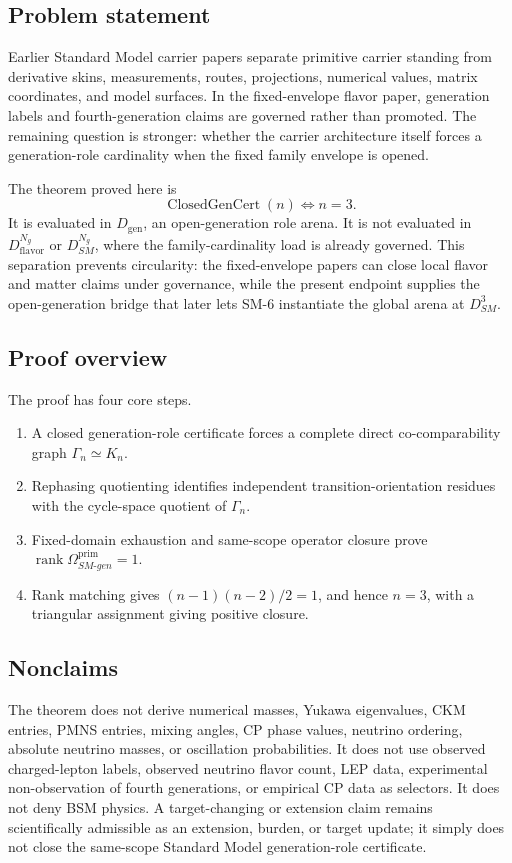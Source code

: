 \documentclass[11pt]{article}
\newcommand{\Dgen}{D_{\mathrm{gen}}}
\newcommand{\DflavNg}{D_{\mathrm{flavor}}^{N_g}}
\newcommand{\DSMN}{D_{SM}^{N_g}}
\newcommand{\DSMthree}{D_{SM}^{3}}
\newcommand{\ClosedGenCert}{\operatorname{ClosedGenCert}}
\newcommand{\rank}{\operatorname{rank}}
\theoremstyle{definition}
\theoremstyle{plain}
\theoremstyle{remark}
\begin{document}
\subsection{Problem statement}
Earlier Standard Model carrier papers separate primitive carrier standing from derivative skins, measurements, routes, projections, numerical values, matrix coordinates, and model surfaces. In the fixed-envelope flavor paper, generation labels and fourth-generation claims are governed rather than promoted. The remaining question is stronger: whether the carrier architecture itself forces a generation-role cardinality when the fixed family envelope is opened.

The theorem proved here is
\[
\ClosedGenCert(n) \Longleftrightarrow n=3.
\]
It is evaluated in \(\Dgen\), an open-generation role arena. It is not evaluated in \(\DflavNg\) or \(\DSMN\), where the family-cardinality load is already governed. This separation prevents circularity: the fixed-envelope papers can close local flavor and matter claims under governance, while the present endpoint supplies the open-generation bridge that later lets SM-6 instantiate the global arena at \(\DSMthree\).

\subsection{Proof overview}
The proof has four core steps.
\begin{enumerate}
\item A closed generation-role certificate forces a complete direct co-comparability graph \(\Gamma_n\simeq K_n\).
\item Rephasing quotienting identifies independent transition-orientation residues with the cycle-space quotient of \(\Gamma_n\).
\item Fixed-domain exhaustion and same-scope operator closure prove \(\rank \Omega_{SM\text{-}gen}^{\mathrm{prim}}=1\).
\item Rank matching gives \((n-1)(n-2)/2=1\), and hence \(n=3\), with a triangular assignment giving positive closure.
\end{enumerate}

\subsection{Nonclaims}
The theorem does not derive numerical masses, Yukawa eigenvalues, CKM entries, PMNS entries, mixing angles, CP phase values, neutrino ordering, absolute neutrino masses, or oscillation probabilities. It does not use observed charged-lepton labels, observed neutrino flavor count, LEP data, experimental non-observation of fourth generations, or empirical CP data as selectors. It does not deny BSM physics. A target-changing or extension claim remains scientifically admissible as an extension, burden, or target update; it simply does not close the same-scope Standard Model generation-role certificate.
\end{document}
